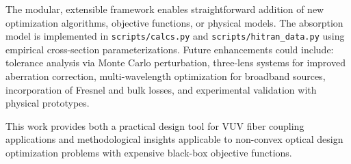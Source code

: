 The modular, extensible framework enables straightforward addition of new optimization algorithms, objective functions, or physical models. The absorption model is implemented in \texttt{scripts/calcs.py} and \texttt{scripts/hitran\_data.py} using empirical cross-section parameterizations. Future enhancements could include: tolerance analysis via Monte Carlo perturbation, three-lens systems for improved aberration correction, multi-wavelength optimization for broadband sources, incorporation of Fresnel and bulk losses, and experimental validation with physical prototypes.

This work provides both a practical design tool for VUV fiber coupling applications and methodological insights applicable to non-convex optical design optimization problems with expensive black-box objective functions.






